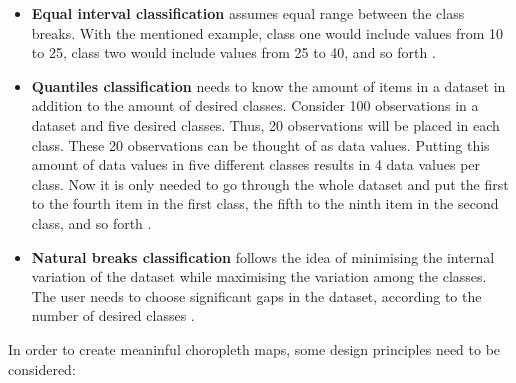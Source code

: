 \begin{itemize}

\item \textbf{Equal interval classification} assumes equal range between the class breaks. With the mentioned example, class one would include values from 10 to 25, class two would include values from 25 to 40, and so forth .

\item \textbf{Quantiles classification} needs to know the amount of items in a dataset in addition to the amount of desired classes. Consider 100 observations in a dataset and five desired classes. Thus, 20 observations will be placed in each class. These 20 observations can be thought of as data values. Putting this amount of data values in five different classes results in 4 data values per class. Now it is only needed to go through the whole dataset and put the first to the fourth item in the first class, the fifth to the ninth item in the second class, and so forth .

\item \textbf{Natural breaks classification} follows the idea of minimising the internal variation of the dataset while maximising the variation among the classes. The user needs to choose significant gaps in the dataset, according to the number of desired classes .

\end{itemize}

In order to create meaninful choropleth maps, some design principles need to be considered:

